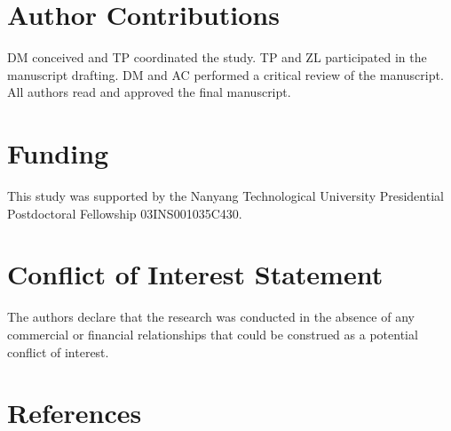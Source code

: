\documentclass[
  english,
  jou,floatsintext]{apa6}
\begin{document}
\hypertarget{author-contributions}{%
\section{Author Contributions}\label{author-contributions}}

DM conceived and TP coordinated the study. TP and ZL participated in the manuscript drafting. DM and AC performed a critical review of the manuscript. All authors read and approved the final manuscript.

\hypertarget{funding}{%
\section{Funding}\label{funding}}

This study was supported by the Nanyang Technological University Presidential Postdoctoral Fellowship 03INS001035C430.

\hypertarget{conflict-of-interest-statement}{%
\section{Conflict of Interest Statement}\label{conflict-of-interest-statement}}

The authors declare that the research was conducted in the absence of any commercial or financial relationships that could be construed as a potential conflict of interest.

\newpage

\hypertarget{references}{%
\section{References}\label{references}}

\begingroup
\setlength{\parindent}{-0.5in}
\setlength{\leftskip}{0.5in}
\end{document}
